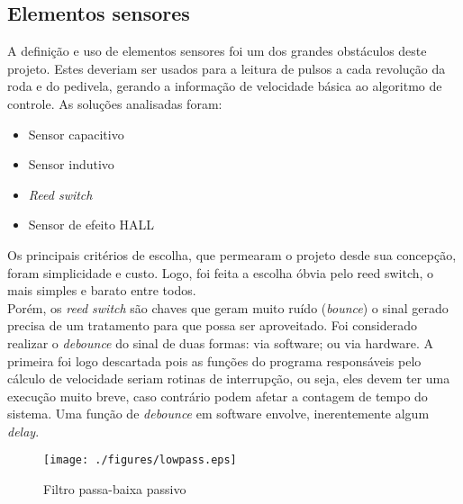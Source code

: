 \documentclass[a4paper,11pt]{article}
\begin{document}
\subsection{Elementos sensores}
\label{sensores}
A definição e uso de elementos sensores foi um dos grandes obstáculos deste projeto. Estes deveriam ser usados para a leitura de pulsos a cada revolução da roda e do pedivela, gerando a informação de velocidade básica ao algoritmo de controle. As soluções analisadas foram:
\begin{itemize}
 \item Sensor capacitivo
 \item Sensor indutivo
 \item \textit{Reed switch}
 \item Sensor de efeito HALL
\end{itemize}
Os principais critérios de escolha, que permearam o projeto desde sua concepção, foram simplicidade e custo.
Logo, foi feita a escolha óbvia pelo reed switch, o mais simples e barato entre todos. \\
Porém, os \textit{reed switch} são chaves que geram muito ruído (\textit{bounce}) o sinal gerado precisa de um tratamento para que possa ser aproveitado. Foi considerado realizar o \textit{debounce} do sinal de duas formas: via software; ou via hardware. A primeira foi logo descartada pois as funções do programa responsáveis pelo cálculo de velocidade seriam rotinas de interrupção, ou seja, eles devem ter uma execução muito breve, caso contrário podem afetar a contagem de tempo do sistema. Uma função de \textit{debounce} em software envolve, inerentemente algum \textit{delay}.\\

\begin{figure}[!h]
 \begin{center}
  \texttt{[image: ./figures/lowpass.eps]}
 \end{center}
 \caption{Filtro passa-baixa passivo}
 \label{fig: lowpass}
\end{figure}
\end{document}
